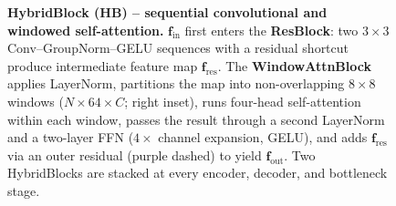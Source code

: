 \begin{figure}[htbp]
\centering
\resizebox{0.62\textwidth}{!}{}
\caption[HybridBlock (HB) internal structure]{%
  \textbf{HybridBlock (HB) -- sequential convolutional and windowed
  self-attention.}
  $\mathbf{f}_{\mathrm{in}}$ first enters the \textbf{ResBlock}: two
  $3{\times}3$ Conv--GroupNorm--GELU sequences with a residual shortcut produce
  intermediate feature map $\mathbf{f}_{\mathrm{res}}$.
  The \textbf{WindowAttnBlock} applies LayerNorm, partitions the map into
  non-overlapping $8{\times}8$ windows ($N{\times}64{\times}C$; right inset),
  runs four-head self-attention within each window, passes the result through a
  second LayerNorm and a two-layer FFN ($4{\times}$ channel expansion, GELU),
  and adds $\mathbf{f}_{\mathrm{res}}$ via an outer residual (purple dashed)
  to yield $\mathbf{f}_{\mathrm{out}}$.
  Two HybridBlocks are stacked at every encoder, decoder, and bottleneck stage.}
\label{fig:arch:hybridblock}
\end{figure}
